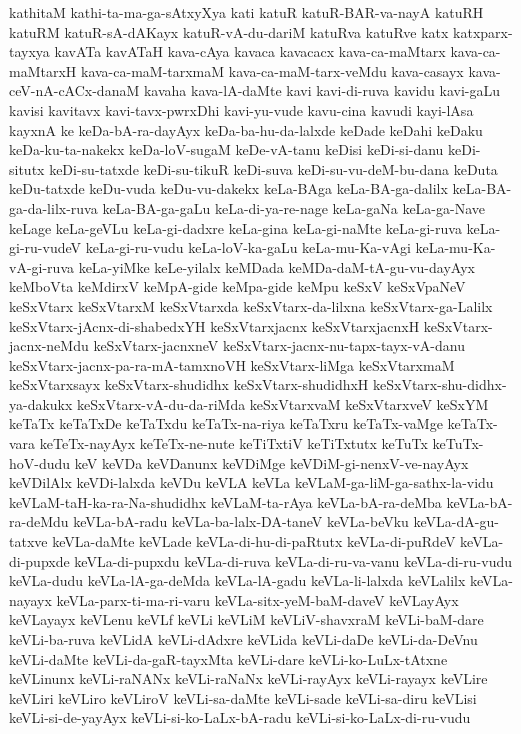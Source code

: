 {kathitaM
kathi-ta-ma-ga-sAtxyXya
kati
katuR
katuR-BAR-va-nayA
katuRH
katuRM
katuR-sA-dAKayx
katuR-vA-du-dariM
katuRva
katuRve
katx
katxparx-tayxya
kavATa
kavATaH
kava-cAya
kavaca
kavacacx
kava-ca-maMtarx
kava-ca-maMtarxH
kava-ca-maM-tarxmaM
kava-ca-maM-tarx-veMdu
kava-casayx
kava-ceV-nA-cACx-danaM
kavaha
kava-lA-daMte
kavi
kavi-di-ruva
kavidu
kavi-gaLu
kavisi
kavitavx
kavi-tavx-pwrxDhi
kavi-yu-vude
kavu-cina
kavudi
kayi-lAsa
kayxnA
ke
keDa-bA-ra-dayAyx
keDa-ba-hu-da-lalxde
keDade
keDahi
keDaku
keDa-ku-ta-nakekx
keDa-loV-sugaM
keDe-vA-tanu
keDisi
keDi-si-danu
keDi-situtx
keDi-su-tatxde
keDi-su-tikuR
keDi-suva
keDi-su-vu-deM-bu-dana
keDuta
keDu-tatxde
keDu-vuda
keDu-vu-dakekx
keLa-BAga
keLa-BA-ga-dalilx
keLa-BA-ga-da-lilx-ruva
keLa-BA-ga-gaLu
keLa-di-ya-re-nage
keLa-gaNa
keLa-ga-Nave
keLage
keLa-geVLu
keLa-gi-dadxre
keLa-gina
keLa-gi-naMte
keLa-gi-ruva
keLa-gi-ru-vudeV
keLa-gi-ru-vudu
keLa-loV-ka-gaLu
keLa-mu-Ka-vAgi
keLa-mu-Ka-vA-gi-ruva
keLa-yiMke
keLe-yilalx
keMDada
keMDa-daM-tA-gu-vu-dayAyx
keMboVta
keMdirxV
keMpA-gide
keMpa-gide
keMpu
keSxV
keSxVpaNeV
keSxVtarx
keSxVtarxM
keSxVtarxda
keSxVtarx-da-lilxna
keSxVtarx-ga-Lalilx
keSxVtarx-jAcnx-di-shabedxYH
keSxVtarxjacnx
keSxVtarxjacnxH
keSxVtarx-jacnx-neMdu
keSxVtarx-jacnxneV
keSxVtarx-jacnx-nu-tapx-tayx-vA-danu
keSxVtarx-jacnx-pa-ra-mA-tamxnoVH
keSxVtarx-liMga
keSxVtarxmaM
keSxVtarxsayx
keSxVtarx-shudidhx
keSxVtarx-shudidhxH
keSxVtarx-shu-didhx-ya-dakukx
keSxVtarx-vA-du-da-riMda
keSxVtarxvaM
keSxVtarxveV
keSxYM
keTaTx
keTaTxDe
keTaTxdu
keTaTx-na-riya
keTaTxru
keTaTx-vaMge
keTaTx-vara
keTeTx-nayAyx
keTeTx-ne-nute
keTiTxtiV
keTiTxtutx
keTuTx
keTuTx-hoV-dudu
keV
keVDa
keVDanunx
keVDiMge
keVDiM-gi-nenxV-ve-nayAyx
keVDilAlx
keVDi-lalxda
keVDu
keVLA
keVLa
keVLaM-ga-liM-ga-sathx-la-vidu
keVLaM-taH-ka-ra-Na-shudidhx
keVLaM-ta-rAya
keVLa-bA-ra-deMba
keVLa-bA-ra-deMdu
keVLa-bA-radu
keVLa-ba-lalx-DA-taneV
keVLa-beVku
keVLa-dA-gu-tatxve
keVLa-daMte
keVLade
keVLa-di-hu-di-paRtutx
keVLa-di-puRdeV
keVLa-di-pupxde
keVLa-di-pupxdu
keVLa-di-ruva
keVLa-di-ru-va-vanu
keVLa-di-ru-vudu
keVLa-dudu
keVLa-lA-ga-deMda
keVLa-lA-gadu
keVLa-li-lalxda
keVLalilx
keVLa-nayayx
keVLa-parx-ti-ma-ri-varu
keVLa-sitx-yeM-baM-daveV
keVLayAyx
keVLayayx
keVLenu
keVLf
keVLi
keVLiM
keVLiV-shavxraM
keVLi-baM-dare
keVLi-ba-ruva
keVLidA
keVLi-dAdxre
keVLida
keVLi-daDe
keVLi-da-DeVnu
keVLi-daMte
keVLi-da-gaR-tayxMta
keVLi-dare
keVLi-ko-LuLx-tAtxne
keVLinunx
keVLi-raNANx
keVLi-raNaNx
keVLi-rayAyx
keVLi-rayayx
keVLire
keVLiri
keVLiro
keVLiroV
keVLi-sa-daMte
keVLi-sade
keVLi-sa-diru
keVLisi
keVLi-si-de-yayAyx
keVLi-si-ko-LaLx-bA-radu
keVLi-si-ko-LaLx-di-ru-vudu
}
